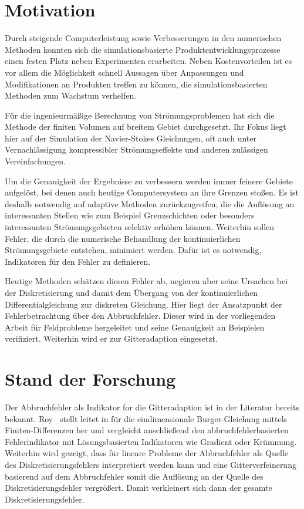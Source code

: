 \section{Motivation}
Durch steigende Computerleistung sowie Verbesserungen in den numerischen Methoden konnten
sich die simulationsbasierte Produktentwicklungsprozesse einen festen Platz neben
Experimenten erarbeiten. Neben Kostenvorteilen ist es vor allem die Möglichkeit
schnell Aussagen über Anpassungen und Modifikationen an Produkten treffen zu können, die
simulationsbasierten Methoden zum Wachstum verhelfen.

Für die ingenieurmäßige Berechnung von Strömungsproblemen hat sich die Methode der
finiten Volumen auf breitem Gebiet durchgesetzt. Ihr Fokus liegt hier auf der Simulation
der Navier-Stokes Gleichungen, oft auch unter Vernachlässigung kompressibler Strömungseffekte und
anderen zulässigen Vereinfachungen.

Um die Genauigkeit der Ergebnisse zu verbessern werden immer feinere Gebiete aufgelöst,
bei denen auch heutige Computersystem an ihre Grenzen stoßen. Es ist deshalb notwendig
auf adaptive Methoden zurückzugreifen, die die Auflösung an interessanten Stellen wie
zum Beispiel Grenzschichten oder besonders interessanten Strömungsgebieten selektiv erhöhen können.
Weiterhin sollen Fehler, die durch die numerische Behandlung der kontinuierlichen Strömungsgebiete
entstehen, minimiert werden. Dafür ist es notwendig, Indikatoren für den Fehler zu definieren.

Heutige Methoden schätzen diesen Fehler ab, negieren aber seine Ursachen bei der Diskretisierung
und damit dem Übergang von der kontinuierlichen Differentialgleichung zur diskreten Gleichung.
Hier liegt der Ansatzpunkt der Fehlerbetrachtung über den Abbruchfehler. Dieser wird in der
vorliegenden Arbeit für Feldprobleme hergeleitet und seine Genauigkeit an Beispielen
verifiziert. Weiterhin wird er zur Gitteradaption eingesetzt.


\section{Stand der Forschung}

Der Abbruchfehler als Indikator for die Gitteradaption ist in der Literatur bereits bekannt.
Roy~\cite{roy2} stellt leitet in für die eindimensionale Burger-Gleichung mittels
Finiten-Differenzen her und vergleicht anschließend den abbruchfehlerbasierten Fehlerindikator
mit Lösungsbasierten Indikatoren wie Gradient oder Krümmung. Weiterhin wird gezeigt,
dass für lineare Probleme der Abbruchfehler
als Quelle des Diskretisierungsfehlers interpretiert werden kann und
eine Gitterverfeinerung basierend auf dem Abbruchfehler
somit die Auflösung an der Quelle des Diskretisierungsfehler vergrößert.
Damit verkleinert sich dann der gesamte Diskretisierungsfehler.

